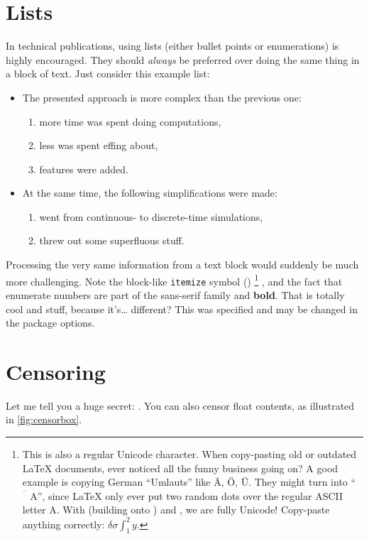 \section{Lists}
In technical publications, using lists (either bullet points or enumerations) is highly encouraged.
They should \emph{always} be preferred over doing the same thing in a block of text.
Just consider this example list:
\begin{itemize}
	\item The presented approach is more complex than the previous one:
	\begin{enumerate}
		\item more time was spent doing computations,
		\item less was spent effing about,
		\item features were added.
	\end{enumerate}
	\item At the same time, the following simplifications were made:
	\begin{enumerate}
		\item went from continuous- to discrete-time simulations,
		\item threw out some superfluous stuff.
	\end{enumerate}
\end{itemize}

Processing the very same information from a text block would suddenly be much more challenging.
Note the block-like \texttt{itemize} symbol (\smblksquare{})%
\footnote{%
	This is also a regular Unicode character.
	When copy-pasting old or outdated \LaTeX{} documents, ever noticed all the funny business going on?
	A good example is copying German \enquote{Umlauts} like Ä, Ö, Ü.
	They might turn into \enquote{\(\ddot{\phantom{A}}\text{A}\)}, since \LaTeX{} only ever put two random dots over the regular ASCII letter A.
	With  (building onto ) and , we are fully Unicode!
	Copy-paste anything correctly: \(\delta \sigma \int_{1}^{2} y\).
}
, and the fact that enumerate numbers are part of the {\sffamily sans-serif family} and \textbf{bold}.
That is totally cool and stuff, because it's\dots{} different?
This was specified and may be changed in the  package options.
\section{Censoring}
Let me tell you a huge secret:  .
You can also censor float contents, as illustrated in \cref{fig:censorbox}.
\begin{figure}
	{%
	}
\end{figure}
